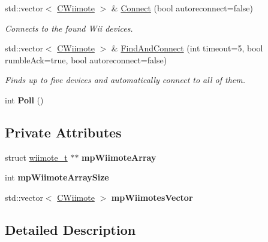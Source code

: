 \begin{DoxyCompactItemize}
\item 
std\-::vector$<$ \hyperlink{class_c_wiimote}{C\-Wiimote} $>$ \& \hyperlink{class_c_wii_aae588e4b73fc2cfe2a50dcc6d23e695d}{Connect} (bool autoreconnect=false)
\begin{DoxyCompactList}\small\item\em Connects to the found Wii devices. \end{DoxyCompactList}\item 
std\-::vector$<$ \hyperlink{class_c_wiimote}{C\-Wiimote} $>$ \& \hyperlink{class_c_wii_ab6ea1b11c12f707d410bf36fee0b16ed}{Find\-And\-Connect} (int timeout=5, bool rumble\-Ack=true, bool autoreconnect=false)
\begin{DoxyCompactList}\small\item\em Finds up to five devices and automatically connect to all of them. \end{DoxyCompactList}\item 
\hypertarget{class_c_wii_acc7affc0e84327f24bd20ef10930f66e}{int {\bfseries Poll} ()}\label{class_c_wii_acc7affc0e84327f24bd20ef10930f66e}

\end{DoxyCompactItemize}
\subsection*{Private Attributes}
\begin{DoxyCompactItemize}
\item 
\hypertarget{class_c_wii_a3067cf1e3f592f3a54afc8cd4d9f04a8}{struct \hyperlink{structwiimote__t}{wiimote\-\_\-t} $\ast$$\ast$ {\bfseries mp\-Wiimote\-Array}}\label{class_c_wii_a3067cf1e3f592f3a54afc8cd4d9f04a8}

\item 
\hypertarget{class_c_wii_ac1979ba03a5d6d4cb90392184bdb083d}{int {\bfseries mp\-Wiimote\-Array\-Size}}\label{class_c_wii_ac1979ba03a5d6d4cb90392184bdb083d}

\item 
\hypertarget{class_c_wii_a85afbf07952e71e4ee87b9a5b6df73e6}{std\-::vector$<$ \hyperlink{class_c_wiimote}{C\-Wiimote} $>$ {\bfseries mp\-Wiimotes\-Vector}}\label{class_c_wii_a85afbf07952e71e4ee87b9a5b6df73e6}

\end{DoxyCompactItemize}


\subsection{Detailed Description}



